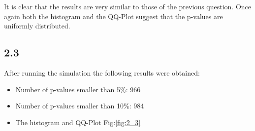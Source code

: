 \documentclass{article}
\begin{document}
      It is clear that the results are very similar to those of the previous question. Once again both the histogram and the QQ-Plot suggest that the p-values are uniformly distributed.

\newpage
    \subsection{2.3}
      After running the simulation the following results were obtained:
      \begin{itemize}
        \item Number of p-values smaller than 5\%: 966
        \item Number of p-values smaller than 10\%: 984
        \item The histogram and QQ-Plot Fig:\ref{fig:2_3}
      \end{itemize}
      
\end{document}

